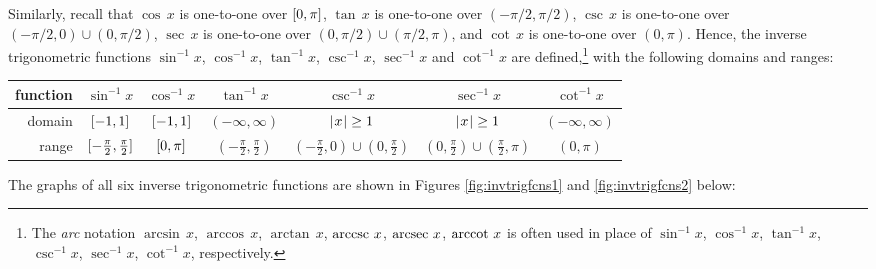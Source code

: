 \noindent Similarly, recall that $\cos\,x$ is one-to-one over $\lbrack 0,\pi \rbrack$,
$\tan\,x$ is one-to-one over $(-\pi/2,\pi/2)$,
$\csc\,x$ is one-to-one over $(-\pi/2,0) \cup (0,\pi/2)$,
$\sec\,x$ is one-to-one over $(0,\pi/2) \cup (\pi/2,\pi)$, and
$\cot\,x$ is one-to-one over $(0,\pi)$. Hence, the inverse trigonometric
functions $\sin^{-1} x$, $\cos^{-1} x$, $\tan^{-1} x$, $\csc^{-1} x$, $\sec^{-1} x$
and $\cot^{-1} x$ are defined,\footnote{The \emph{arc} notation $\arcsin\,x$,
$\arccos\,x$, $\arctan\,x$, $\operatorname{arccsc}\,x$, $\operatorname{arcsec}\,x$, $\operatorname{arccot}\,x$ is often
used in place of $\sin^{-1}x$, $\cos^{-1}x$, $\tan^{-1}x$, $\csc^{-1}x$,
$\sec^{-1}x$, $\cot^{-1}x$, respectively.} with the following domains and ranges:

\begin{center}
\bgroup
\def\arraystretch{1.5}
\begin{tabular}{@{}|r||c|c|c|c|c|c|@{}}
\hline
function & $\sin^{-1} x$ & $\cos^{-1} x$ & $\tan^{-1} x$ & $\csc^{-1} x$ & $\sec^{-1} x$ & $\cot^{-1} x$\\
\hline
domain & $\lbrack -1,1 \rbrack$ & $\lbrack -1,1 \rbrack$ & $(-\infty,\infty)$ & $\lvert\mspace{1mu}x\mspace{1mu}\rvert \ge 1$ & $\lvert\mspace{1mu}x\mspace{1mu}\rvert \ge 1$
& $(-\infty,\infty)$\\
\hline
range & $\lbrack -\tfrac{\pi}{2},\tfrac{\pi}{2} \rbrack$ & $\lbrack 0,\pi \rbrack$ &
$\left(-\tfrac{\pi}{2},\tfrac{\pi}{2}\right)$ &
$\left(-\tfrac{\pi}{2},0\right) \cup \left(0,\tfrac{\pi}{2}\right)$ &
$\left(0,\tfrac{\pi}{2}\right) \cup \left(\tfrac{\pi}{2},\pi\right)$ &
$(0,\pi)$\\
\hline
\end{tabular}
\egroup
\end{center}

\noindent The graphs of all six inverse trigonometric functions are shown in
Figures \ref{fig:invtrigfcns1} and \ref{fig:invtrigfcns2} below:

